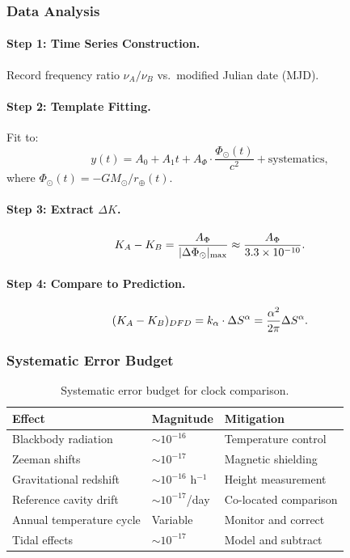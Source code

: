 \subsubsection{Data Analysis}

\paragraph{Step 1: Time Series Construction.}
Record frequency ratio $\nu_A/\nu_B$ vs.\ modified Julian date (MJD).

\paragraph{Step 2: Template Fitting.}
Fit to:
\begin{equation}
y(t) = A_0 + A_1 t + A_\Phi \cdot \frac{\Phi_\odot(t)}{c^2} + \text{systematics},
\end{equation}
where $\Phi_\odot(t) = -GM_\odot/r_\oplus(t)$.

\paragraph{Step 3: Extract $\Delta K$.}
\begin{equation}
K_A - K_B = \frac{A_\Phi}{|\Delta\Phi_\odot|_{\rm max}} \approx \frac{A_\Phi}{3.3 \times 10^{-10}}.
\end{equation}

\paragraph{Step 4: Compare to Prediction.}
\begin{equation}
(K_A - K_B)_{DFD} = k_\alpha \cdot \Delta S^\alpha = \frac{\alpha^2}{2\pi}\Delta S^\alpha.
\end{equation}

\subsubsection{Systematic Error Budget}

\begin{table}[h!]
\centering
\caption{Systematic error budget for clock comparison.}
\label{tab:clock_systematics}
\begin{tabular}{lll}
\toprule
\textbf{Effect} & \textbf{Magnitude} & \textbf{Mitigation} \\
\midrule
Blackbody radiation & $\sim 10^{-16}$ & Temperature control \\
Zeeman shifts & $\sim 10^{-17}$ & Magnetic shielding \\
Gravitational redshift & $\sim 10^{-16}$ h$^{-1}$ & Height measurement \\
Reference cavity drift & $\sim 10^{-17}$/day & Co-located comparison \\
Annual temperature cycle & Variable & Monitor and correct \\
Tidal effects & $\sim 10^{-17}$ & Model and subtract \\
\bottomrule
\end{tabular}
\end{table}

